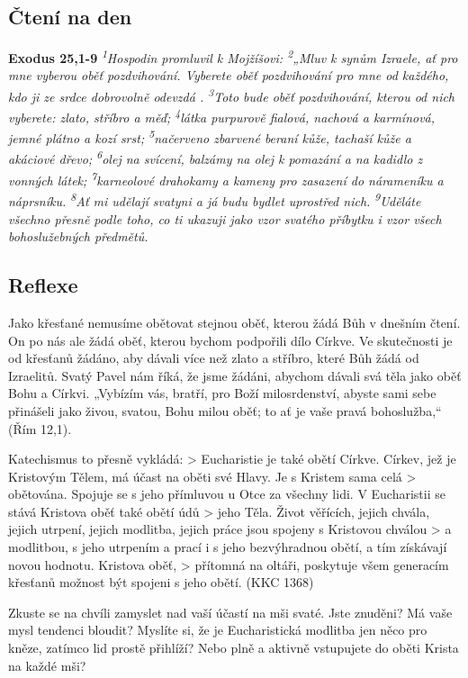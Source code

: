 \documentclass[11pt]{article}
\begin{document}
\subsection*{Čtení na den}
\textbf{Exodus 25,1-9}
\newline
\textit{
\textsuperscript{1}Hospodin promluvil k Mojžíšovi:
\textsuperscript{2}„Mluv k synům Izraele, ať pro mne vyberou oběť pozdvihování. Vyberete oběť pozdvihování pro mne od každého, kdo ji ze srdce dobrovolně odevzdá .
\textsuperscript{3}Toto bude oběť pozdvihování, kterou od nich vyberete: zlato, stříbro a měď;
\textsuperscript{4}látka purpurově fialová, nachová a karmínová, jemné plátno a kozí srst;
\textsuperscript{5}načerveno zbarvené beraní kůže, tachaší kůže a akáciové dřevo;
\textsuperscript{6}olej na svícení, balzámy na olej k pomazání a na kadidlo z vonných látek;
\textsuperscript{7}karneolové drahokamy a kameny pro zasazení do nárameníku a náprsníku.
\textsuperscript{8}Ať mi udělají svatyni a já budu bydlet uprostřed nich.
\textsuperscript{9}Uděláte všechno přesně podle toho, co ti ukazuji jako vzor svatého příbytku i vzor všech bohoslužebných předmětů.
}

\subsection*{Reflexe}
Jako křesťané nemusíme obětovat stejnou oběť, kterou žádá Bůh v dnešním čtení. On po nás ale žádá oběť, kterou bychom
podpořili dílo Církve. Ve skutečnosti je od křesťanů žádáno, aby dávali více než zlato a stříbro, které Bůh žádá od Izraelitů. Svatý
Pavel nám říká, že jsme žádáni, abychom dávali svá těla jako oběť Bohu a Církvi. „Vybízím vás, bratří, pro Boží milosrdenství,
abyste sami sebe přinášeli jako živou, svatou, Bohu milou oběť; to ať je vaše pravá bohoslužba,“ (Řím 12,1).

Katechismus to přesně vykládá:
> Eucharistie je také obětí Církve. Církev, jež je Kristovým Tělem, má účast na oběti své Hlavy. Je s Kristem sama celá
> obětována. Spojuje se s jeho přímluvou u Otce za všechny lidi. V Eucharistii se stává Kristova oběť také obětí údů
> jeho Těla. Život věřících, jejich chvála, jejich utrpení, jejich modlitba, jejich práce jsou spojeny s Kristovou chválou
> a modlitbou, s jeho utrpením a prací i s jeho bezvýhradnou obětí, a tím získávají novou hodnotu. Kristova oběť,
> přítomná na oltáři, poskytuje všem generacím křesťanů možnost být spojeni s jeho obětí. (KKC 1368)

Zkuste se na chvíli zamyslet nad vaší účastí na mši svaté. Jste znuděni? Má vaše mysl tendenci bloudit? Myslíte si, že je
Eucharistická modlitba jen něco pro kněze, zatímco lid prostě přihlíží? Nebo plně a aktivně vstupujete do oběti Krista na každé
mši?
\end{document}
